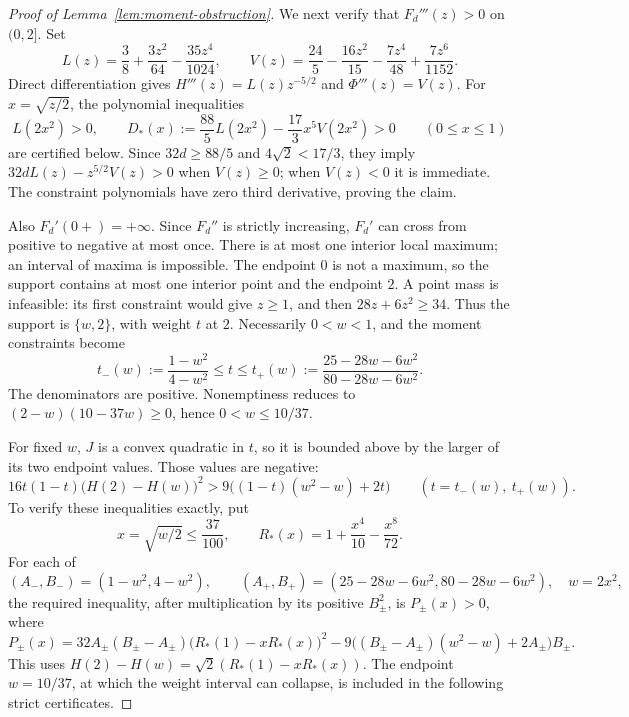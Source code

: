 \begin{proof}[Proof of Lemma~\ref{lem:moment-obstruction}]
We next verify that $F_d'''(z)>0$ on $(0,2]$.  Set
\[
 L(z)=\frac38+\frac{3z^2}{64}-\frac{35z^4}{1024},\qquad
 V(z)=\frac{24}{5}-\frac{16z^2}{15}-\frac{7z^4}{48}
                         +\frac{7z^6}{1152}.
\]
Direct differentiation gives $H'''(z)=L(z)z^{-5/2}$ and
$\Phi'''(z)=V(z)$.  For $x=\sqrt{z/2}$, the polynomial inequalities
\[
 L(2x^2)>0,\qquad
 D_*(x):=\frac{88}{5}L(2x^2)-\frac{17}{3}x^5V(2x^2)>0
 \qquad(0\le x\le1)
\]
are certified below.  Since $32d\ge88/5$ and $4\sqrt2<17/3$, they imply
$32dL(z)-z^{5/2}V(z)>0$ when $V(z)\ge0$; when $V(z)<0$ it is immediate.
The constraint polynomials have zero third derivative, proving the
claim.

Also $F_d'(0+)=+\infty$.  Since $F_d''$ is strictly increasing, $F_d'$
can cross from positive to negative at most once.  There is at most
one interior local maximum; an interval of maxima is impossible.
The endpoint $0$ is not a maximum, so the support contains at most
one interior point and the endpoint $2$.  A point mass is infeasible:
its first constraint would give $z\ge1$, and then
$28z+6z^2\ge34$.  Thus the support is $\{w,2\}$, with weight $t$ at $2$.
Necessarily $0<w<1$, and the moment constraints become
\[
 t_-(w):=\frac{1-w^2}{4-w^2}\le t\le
 t_+(w):=\frac{25-28w-6w^2}{80-28w-6w^2}.
\]
The denominators are positive.  Nonemptiness reduces to
$(2-w)(10-37w)\ge0$, hence $0<w\le10/37$.

For fixed $w$, $J$ is a convex quadratic in $t$, so it is bounded above
by the larger of its two endpoint values.  Those values are negative:
\[
 16t(1-t)\bigl(H(2)-H(w)\bigr)^2
 >9\bigl((1-t)(w^2-w)+2t\bigr)
 \qquad(t=t_-(w),\ t_+(w)).
\]
To verify these inequalities exactly, put
\[
 x=\sqrt{w/2}\le\frac{37}{100},\qquad
 R_*(x)=1+\frac{x^4}{10}-\frac{x^8}{72}.
\]
For each of
\[
 (A_-,B_-)=(1-w^2,4-w^2),\qquad
 (A_+,B_+)=(25-28w-6w^2,80-28w-6w^2),\quad w=2x^2,
\]
the required inequality, after multiplication by its positive
$B_\pm^2$, is $P_\pm(x)>0$, where
\[
 P_\pm(x)=32A_\pm(B_\pm-A_\pm)
                \bigl(R_*(1)-xR_*(x)\bigr)^2
 -9\bigl((B_\pm-A_\pm)(w^2-w)+2A_\pm\bigr)B_\pm.
\]
This uses $H(2)-H(w)=\sqrt2(R_*(1)-xR_*(x))$.
The endpoint $w=10/37$, at which the weight interval can collapse, is
included in the following strict certificates.


\end{proof}
